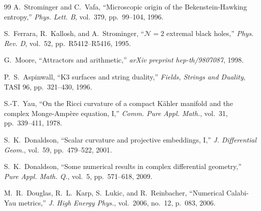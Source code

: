 \documentclass[11pt, a4paper]{article}
\begin{document}
\begin{thebibliography}{99}
A.~Strominger and C.~Vafa, ``Microscopic origin of the Bekenstein-Hawking entropy,'' \emph{Phys. Lett. B}, vol.~379, pp.~99--104, 1996.

S.~Ferrara, R.~Kallosh, and A.~Strominger, ``$\mathcal{N}=2$ extremal black holes,'' \emph{Phys. Rev. D}, vol.~52, pp.~R5412--R5416, 1995.

G.~Moore, ``Attractors and arithmetic,'' \emph{arXiv preprint hep-th/9807087}, 1998.

P.~S.~Aspinwall, ``K3 surfaces and string duality,'' \emph{Fields, Strings and Duality}, TASI 96, pp.~321--430, 1996.

S.-T.~Yau, ``On the Ricci curvature of a compact Kähler manifold and the complex Monge-Ampère equation, I,'' \emph{Comm. Pure Appl. Math.}, vol.~31, pp.~339--411, 1978.

S.~K.~Donaldson, ``Scalar curvature and projective embeddings, I,'' \emph{J. Differential Geom.}, vol.~59, pp.~479--522, 2001.

S.~K.~Donaldson, ``Some numerical results in complex differential geometry,'' \emph{Pure Appl. Math. Q.}, vol.~5, pp.~571--618, 2009.

M.~R.~Douglas, R.~L.~Karp, S.~Lukic, and R.~Reinbacher, ``Numerical Calabi-Yau metrics,'' \emph{J. High Energy Phys.}, vol.~2006, no.~12, p.~083, 2006.
\end{thebibliography}
\end{document}
